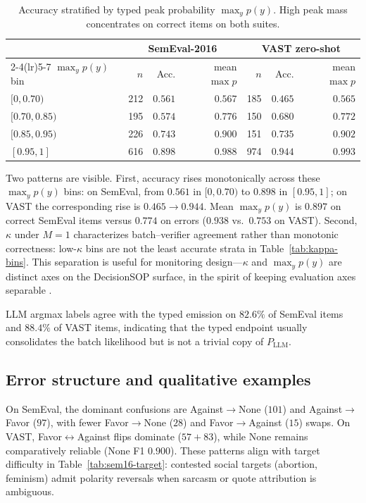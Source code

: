 \documentclass[10pt]{article}
\theoremstyle{definition}
\begin{document}
\begin{table}[H]
\centering
\small
\begin{tabular}{lrrrrrr}
\toprule
& \multicolumn{3}{c}{SemEval-2016} & \multicolumn{3}{c}{VAST zero-shot} \\
\cmidrule(lr){2-4}\cmidrule(lr){5-7}
$\max_y p(y)$ bin & $n$ & Acc. & mean $\max p$ & $n$ & Acc. & mean $\max p$ \\
\midrule
$[0,0.70)$ & 212 & $0.561$ & $0.567$ & 185 & $0.465$ & $0.565$ \\
$[0.70,0.85)$ & 195 & $0.574$ & $0.776$ & 150 & $0.680$ & $0.772$ \\
$[0.85,0.95)$ & 226 & $0.743$ & $0.900$ & 151 & $0.735$ & $0.902$ \\
$[0.95,1]$ & 616 & $0.898$ & $0.988$ & 974 & $0.944$ & $0.993$ \\
\bottomrule
\end{tabular}
\caption{Accuracy stratified by typed peak probability $\max_y p(y)$.
High peak mass concentrates on correct items on both suites.}
\label{tab:maxp-bins}
\end{table}

Two patterns are visible.
First, accuracy rises monotonically across these $\max_y p(y)$ bins: on SemEval, from
$0.561$ in $[0,0.70)$ to $0.898$ in $[0.95,1]$; on VAST the corresponding rise is $0.465\rightarrow 0.944$.
Mean $\max_y p(y)$ is $0.897$ on correct SemEval items versus $0.774$ on errors ($0.938$ vs.\ $0.753$ on
VAST).
Second, $\kappa$ under $M{=}1$ characterizes batch--verifier agreement rather than monotonic correctness:
low-$\kappa$ bins are not the least accurate strata in Table~\ref{tab:kappa-bins}.
This separation is useful for monitoring design---$\kappa$ and $\max_y p(y)$ are distinct axes on the
DecisionSOP surface, in the spirit of keeping evaluation axes separable
\cite{souly2024strongreject,yan2025confusion}.

LLM argmax labels agree with the typed emission on $82.6\%$ of SemEval items and $88.4\%$ of VAST items,
indicating that the typed endpoint usually consolidates the batch likelihood but is not a trivial copy of
$P_{\mathrm{LLM}}$.

\subsection{Error structure and qualitative examples}
\label{sec:qual}
On SemEval, the dominant confusions are Against$\rightarrow$None ($101$) and Against$\rightarrow$Favor
($97$), with fewer Favor$\rightarrow$None ($28$) and Favor$\rightarrow$Against ($15$) swaps.
On VAST, Favor$\leftrightarrow$Against flips dominate ($57{+}83$), while None remains comparatively reliable
(None F1 $0.900$).
These patterns align with target difficulty in Table~\ref{tab:sem16-target}: contested social targets
(abortion, feminism) admit polarity reversals when sarcasm or quote attribution is ambiguous.
\end{document}
